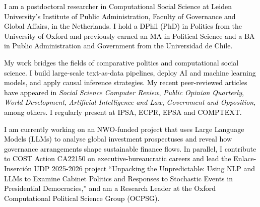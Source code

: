 \begin{cvparagraph}

\textcolor{black}{I am a postdoctoral researcher in Computational Social Science at Leiden University’s Institute of Public Administration, Faculty of Governance and Global Affairs, in the Netherlands. I hold a DPhil (PhD) in Politics from the University of Oxford and previously earned an MA in Political Science and a BA in Public Administration and Government from the Universidad de Chile.}



\textcolor{black}{My work bridges the fields of comparative politics and computational social science. I build large-scale text-as-data pipelines, deploy AI and machine learning models, and apply causal inference strategies. My recent peer-reviewed articles have appeared in {\itshape Social Science Computer Review}, {\itshape Public Opinion Quarterly}, {\itshape World Development}, {\itshape Artificial Intelligence and Law}, {\itshape Government and Opposition}, among others. I regularly present at IPSA, ECPR, EPSA and COMPTEXT.}

\textcolor{black}{I am currently working on an NWO-funded project that uses Large Language Models (LLMs) to analyse global investment prospectuses and reveal how governance arrangements shape sustainable finance flows. In parallel, I contribute to COST Action CA22150 on executive-bureaucratic careers and lead the Enlace-Inserción UDP 2025-2026 project “Unpacking the Unpredictable: Using NLP and LLMs to Examine Cabinet Politics and Responses to Stochastic Events in Presidential Democracies,” and am a Research Leader at the Oxford Computational Political Science Group (OCPSG).}

\vspace{1mm}
\end{cvparagraph}

